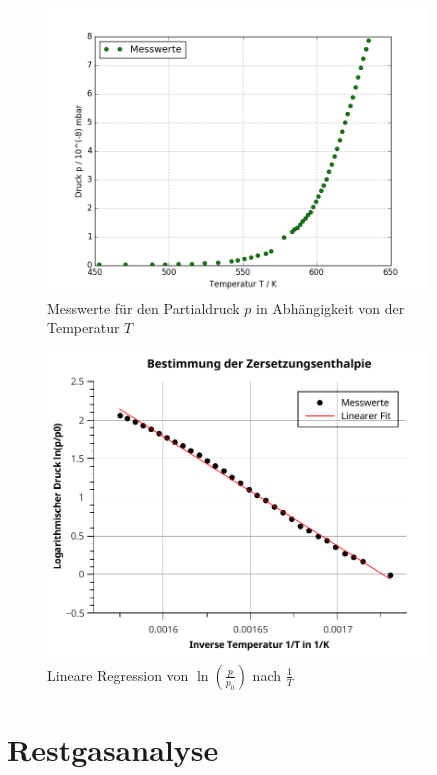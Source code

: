 \begin{figure}[tb]
	\centering\includegraphics[width=0.9\textwidth]{fig/massen_a6_1.png}
	\caption{Messwerte für den Partialdruck $p$ in Abhängigkeit von der Temperatur $T$}
	\label{fig:v61}
\end{figure}

\begin{figure}[tb]
	\centering\includegraphics[width=0.9\textwidth]{fig/massen_a6_reg.pdf}
	\caption{Lineare Regression von $\ln\left(\frac{p}{p_{0}}\right)$ nach $\frac{1}{T}$}
	\label{fig:v62}
\end{figure}

\section{Restgasanalyse}

